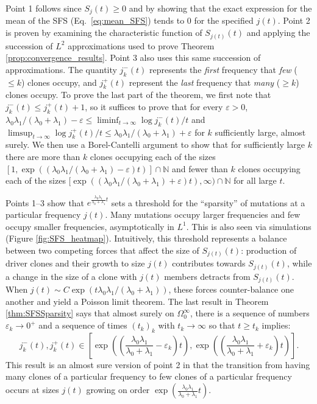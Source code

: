 \documentclass{article}
\numberwithin{equation}{section}
\begin{document}
Point 1 follows since $S_j(t)\geq 0$ and by showing that the exact expression for the mean of the SFS (Eq.~\ref{eq:mean_SFS}) tends to $0$ for the specified $j(t)$. Point 2 is proven by examining the characteristic function of $S_{j(t)}(t)$ and applying the succession of $L^2$ approximations used to prove Theorem \ref{prop:convergence_results}. Point 3 also uses this same succession of approximations. The quantity $j_k^-(t)$ represents the {\em first} frequency that {\em few} ($\leq k$) clones occupy, and $j_k^+(t)$ represent the {\em last} frequency that {\em many} ($\geq k$) clones occupy. To prove the last part of the theorem, we first note that $j_k^-(t)\leq j_k^+(t)+1$, so it suffices to prove that for every $\varepsilon>0$, $\lambda_0\lambda_1/(\lambda_0+\lambda_1)-\varepsilon\leq \liminf_{t\to\infty}\log j_k^-(t)/t$ and $\limsup_{t\to\infty}\log j_k^+(t)/t\leq \lambda_0\lambda_1/(\lambda_0+\lambda_1)+\varepsilon$ for $k$ sufficiently large, almost surely. We then use a Borel-Cantelli argument to show that for sufficiently large $k$ there are more than $k$ clones occupying each of the sizes $[1,\exp((\lambda_0\lambda_1/(\lambda_0+\lambda_1)-\varepsilon)t)]\cap \mathbb{N}$ and fewer than $k$ clones occupying each of the sizes $[\exp((\lambda_0\lambda_1/(\lambda_0+\lambda_1)+\varepsilon)t),\infty)\cap \mathbb{N}$ for all large $t$.

Points 1--3 show that $e^{\frac{\lambda_0\lambda_1}{\lambda_0+\lambda_1}t}$ sets a threshold for the ``sparsity'' of mutations at a particular frequency $j(t)$. Many mutations occupy larger frequencies and few occupy smaller frequencies, asymptotically in $L^1$. This is also seen via simulations (Figure \ref{fig:SFS_heatmap}). Intuitively, this threshold represents a balance between two competing forces that affect the size of $S_{j(t)}(t)$: production of driver clones and their growth to size $j(t)$ contributes towards $S_{j(t)}(t)$, while a change in the size of a clone with $j(t)$ members detracts from $S_{j(t)}(t)$. When $j(t)\sim C\exp(t\lambda_0\lambda_1/(\lambda_0+\lambda_1))$, these forces counter-balance one another and yield a Poisson limit theorem.
The last result in Theorem \ref{thm:SFSSparsity} says that almost surely on $\Omega_0^\infty$, there is a sequence of numbers $\varepsilon_k\to 0^+$ and a sequence of times $(t_k)_k$ with $t_k \to \infty$ so that $t\geq t_k$ implies:
\[j_k^-(t),j_k^+(t)\in \left[\exp\left(\left(\frac{\lambda_0\lambda_1}{\lambda_0+\lambda_1}-\varepsilon_k\right)t\right),\exp\left(\left(\frac{\lambda_0\lambda_1}{\lambda_0+\lambda_1}+\varepsilon_k\right)t\right)\right].\]
This result is an almost sure version of point 2 in that the transition from having many clones of a particular frequency to few clones of a particular frequency occurs at sizes $j(t)$ growing on order $\exp\left(\frac{\lambda_0\lambda_1}{\lambda_0+\lambda_1}t\right)$.
\end{document}
